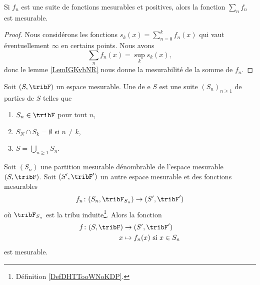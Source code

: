 \begin{proposition}\label{PropFYPEOIJ}
    Si \( f_n\) est une suite de fonctions mesurables et positives, alors la fonction \( \sum_nf_n\) est mesurable.
\end{proposition}

\begin{proof}
    Nous considérons les fonctions \( s_k(x)=\sum_{n=0}^kf_n(x)\) qui vaut éventuellement \( \infty\) en certains points. Nous avons
    \begin{equation}
        \sum_nf_n(x)=\sup_ks_k(x),
    \end{equation}
    donc le lemme \ref{LemIGKvbNR} nous donne la mesurabilité de la somme de \( f_n\).
\end{proof}

\begin{definition}      \label{ooUDHFooJjKscR}
    Soit \( (S,\tribF)\) un espace mesurable. 
    Une  de e \( S\) est une suite  \( (S_n)_{n\geq 1}\) de parties de \( S\) telles que
    \begin{enumerate}
        \item
            \( S_n\in\tribF\) pour tout \( n\),
        \item
            \( S_N\cap S_k=\emptyset\) si \( n\neq k\),
        \item
            \( S=\bigcup_{n\geq 1}S_n\).
    \end{enumerate}
\end{definition}

\begin{lemma}     \label{LEMooXAPQooPpZUmP}
    Soit \( (S_n)\) une partition mesurable dénombrable de l'espace mesurable $(S,\tribF)$. Soit \( (S',\tribF')\) un autre espace mesurable et des fonctions mesurables
    \begin{equation}
        f_n\colon (S_n,\tribF_{S_n})\to (S',\tribF')
    \end{equation}
    où \( \tribF_{S_n}\) est la tribu induite\footnote{Définition \ref{DefDHTTooWNoKDP}.}. Alors la fonction
    \begin{equation}
        \begin{aligned}
            f\colon (S,\tribF)&\to (S',\tribF') \\
            x&\mapsto \text{\( f_n(x)\) si \( x\in S_n\)} 
        \end{aligned}
    \end{equation}
    est mesurable.
\end{lemma}

